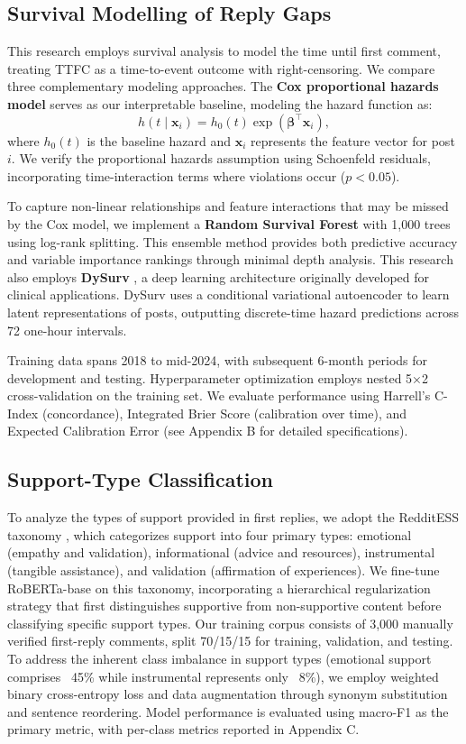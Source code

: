 \documentclass[letterpaper]{article} %
\begin{document}
\subsection{Survival Modelling of Reply Gaps}

This research employs survival analysis to model the time until first comment, treating TTFC as a time-to-event outcome with right-censoring. We compare three complementary modeling approaches. The \textbf{Cox proportional hazards model} serves as our interpretable baseline, modeling the hazard function as:
\begin{equation}
h(t\mid\mathbf{x}_i) = h_0(t)\exp(\boldsymbol{\beta}^{\top}\mathbf{x}_i),
\end{equation}
where $h_0(t)$ is the baseline hazard and $\mathbf{x}_i$ represents the feature vector for post $i$. We verify the proportional hazards assumption using Schoenfeld residuals, incorporating time-interaction terms where violations occur ($p < 0.05$).

To capture non-linear relationships and feature interactions that may be missed by the Cox model, we implement a \textbf{Random Survival Forest} \citep{fantazzini2009random} with 1,000 trees using log-rank splitting. This ensemble method provides both predictive accuracy and variable importance rankings through minimal depth analysis. This research also employs \textbf{DySurv} \citep{mesinovic2024dysurv}, a deep learning architecture originally developed for clinical applications. DySurv uses a conditional variational autoencoder to learn latent representations of posts, outputting discrete-time hazard predictions across 72 one-hour intervals.

Training data spans 2018 to mid-2024, with subsequent 6-month periods for development and testing. Hyperparameter optimization employs nested 5×2 cross-validation on the training set. We evaluate performance using Harrell's C-Index (concordance), Integrated Brier Score (calibration over time), and Expected Calibration Error (see Appendix B for detailed specifications).
\subsection{Support-Type Classification}
To analyze the types of support provided in first replies, we adopt the RedditESS taxonomy \citep{alghamdi2025redditess}, which categorizes support into four primary types: emotional (empathy and validation), informational (advice and resources), instrumental (tangible assistance), and validation (affirmation of experiences). We fine-tune RoBERTa-base on this taxonomy, incorporating a hierarchical regularization strategy that first distinguishes supportive from non-supportive content before classifying specific support types. Our training corpus consists of 3,000 manually verified first-reply comments, split 70/15/15 for training, validation, and testing. To address the inherent class imbalance in support types (emotional support comprises ~45\% while instrumental represents only ~8\%), we employ weighted binary cross-entropy loss and data augmentation through synonym substitution and sentence reordering. Model performance is evaluated using macro-F1 as the primary metric, with per-class metrics reported in Appendix C.
\end{document}
